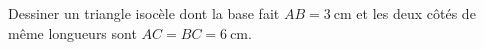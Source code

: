 
\begin{exercice}\label{exosmath-0912}

    Dessiner un triangle isocèle dont la base fait \( AB=\SI{3}{\centi\meter}\) et les deux côtés de même longueurs sont \( AC=BC=\SI{6}{\centi\meter}\).

\end{exercice}

